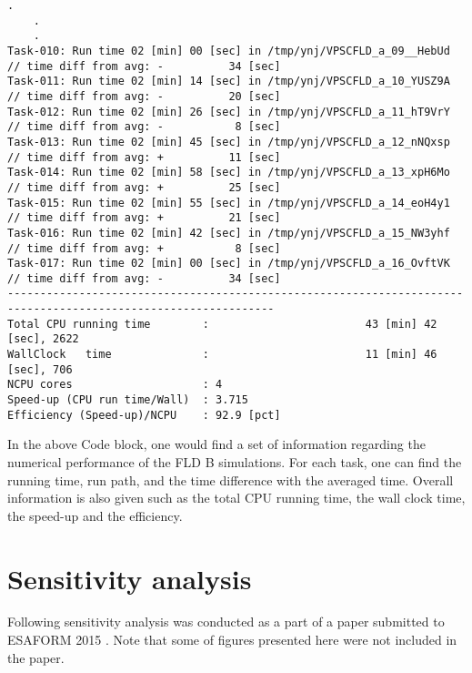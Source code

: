 \documentclass[12pt]{amsart}
\begin{document}
\begin{landscape}
  \begin{lstlisting}[style=sh, caption=FLD region A computational performance (version 2.1), label={code:timepa}]
    .
    .
    .
Task-010: Run time 02 [min] 00 [sec] in /tmp/ynj/VPSCFLD_a_09__HebUd // time diff from avg: -          34 [sec]
Task-011: Run time 02 [min] 14 [sec] in /tmp/ynj/VPSCFLD_a_10_YUSZ9A // time diff from avg: -          20 [sec]
Task-012: Run time 02 [min] 26 [sec] in /tmp/ynj/VPSCFLD_a_11_hT9VrY // time diff from avg: -           8 [sec]
Task-013: Run time 02 [min] 45 [sec] in /tmp/ynj/VPSCFLD_a_12_nNQxsp // time diff from avg: +          11 [sec]
Task-014: Run time 02 [min] 58 [sec] in /tmp/ynj/VPSCFLD_a_13_xpH6Mo // time diff from avg: +          25 [sec]
Task-015: Run time 02 [min] 55 [sec] in /tmp/ynj/VPSCFLD_a_14_eoH4y1 // time diff from avg: +          21 [sec]
Task-016: Run time 02 [min] 42 [sec] in /tmp/ynj/VPSCFLD_a_15_NW3yhf // time diff from avg: +           8 [sec]
Task-017: Run time 02 [min] 00 [sec] in /tmp/ynj/VPSCFLD_a_16_OvftVK // time diff from avg: -          34 [sec]
---------------------------------------------------------------------------------------------------------------
Total CPU running time        :                        43 [min] 42 [sec], 2622
WallClock   time              :                        11 [min] 46 [sec], 706
NCPU cores                    : 4
Speed-up (CPU run time/Wall)  : 3.715
Efficiency (Speed-up)/NCPU    : 92.9 [pct]
\end{lstlisting}
\end{landscape}
In the above Code block, one would find a set of information regarding the numerical performance of the FLD B simulations.
For each task, one can find the running time, run path, and the time difference with the averaged time.
Overall information is also given such as the total CPU running time, the wall clock time, the speed-up and the efficiency.

\newpage
\section{Sensitivity analysis}
\label{sec:sens}
Following sensitivity analysis was conducted as a part of a paper submitted to ESAFORM 2015 \cite{jeong2015ESA}.
Note that some of figures presented here were not included in the paper.
\end{document}
